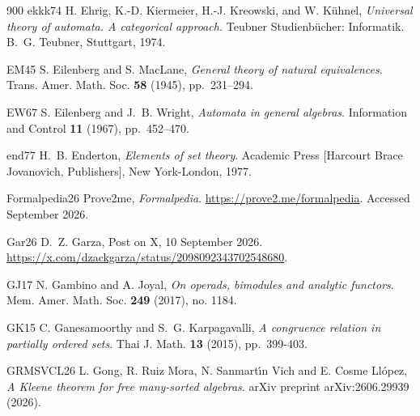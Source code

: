 \begin{thebibliography}{900}
\bibitem%
{ekkk74} H. Ehrig, K.-D. Kiermeier, H.-J. Kreowski, and W. K\"{u}hnel,\emph{ Universal theory of automata. A categorical approach.} Teubner Studienb\"{u}cher: Informatik. B.~G. Teubner, Stuttgart, 1974.

\bibitem%
{EM45} S. Eilenberg and S. MacLane, \emph{General theory of natural equivalences}. Trans. Amer. Math. Soc. \textbf{58} (1945), pp.~231--294. 

\bibitem%
{EW67} S. Eilenberg and J.~B. Wright, \emph{Automata in general algebras}. Information and Control \textbf{11} (1967),  pp.~452--470.






\bibitem%
{end77} H.~B. Enderton, \emph{Elements of set theory}. Academic Press [Harcourt Brace Jovanovich, Publishers], New York-London, 1977. 

\bibitem%
{Formalpedia26} Prove2me, \emph{Formalpedia}. \url{https://prove2.me/formalpedia}. Accessed September 2026.

\bibitem%
{Gar26} D.~Z. Garza, Post on X, 10 September 2026. \url{https://x.com/dzackgarza/status/2098092343702548680}.

\bibitem%
{GJ17} N. Gambino and A. Joyal, \emph{On operads, bimodules and analytic functors}. Mem. Amer. Math. Soc.  \textbf{249} (2017), no. 1184.

\bibitem%
{GK15} C. Ganesamoorthy and S.~G. Karpagavalli, \emph{A congruence relation in partially ordered sets}. Thai J. Math. \textbf{13} (2015), pp.~399-403.

\bibitem%
{GRMSVCL26} L. Gong, R. Ruiz Mora, N. Sanmart\'{\i}n Vich and E. Cosme Ll\'{o}pez, \emph{A Kleene theorem for free many-sorted algebras}. arXiv preprint arXiv:2606.29939 (2026).


\end{thebibliography}
